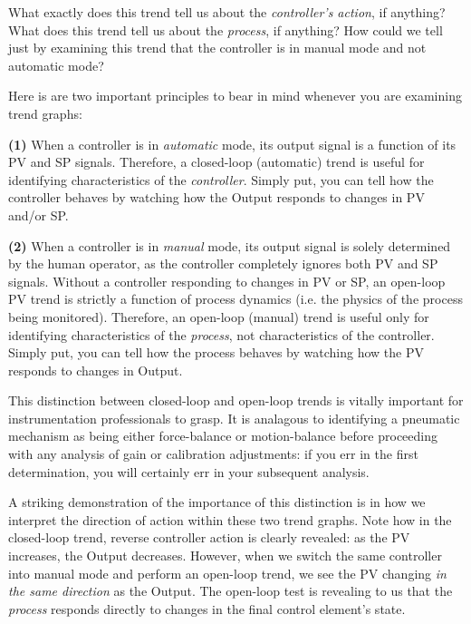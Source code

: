 What exactly does this trend tell us about the {\it controller's action}, if anything?  What does this trend tell us about the {\it process}, if anything?  How could we tell just by examining this trend that the controller is in manual mode and not automatic mode?







\noindent
Here is are two important principles to bear in mind whenever you are examining trend graphs: 

\vskip 10pt

{\bf (1)} When a controller is in {\it automatic} mode, its output signal is a function of its PV and SP signals.  Therefore, a closed-loop (automatic) trend is useful for identifying characteristics of the {\it controller}.  Simply put, you can tell how the controller behaves by watching how the Output responds to changes in PV and/or SP.

\vskip 10pt

{\bf (2)} When a controller is in {\it manual} mode, its output signal is solely determined by the human operator, as the controller completely ignores both PV and SP signals.  Without a controller responding to changes in PV or SP, an open-loop PV trend is strictly a function of process dynamics (i.e. the physics of the process being monitored).  Therefore, an open-loop (manual) trend is useful only for identifying characteristics of the {\it process}, not characteristics of the controller.  Simply put, you can tell how the process behaves by watching how the PV responds to changes in Output.

\vskip 10pt

This distinction between closed-loop and open-loop trends is vitally important for instrumentation professionals to grasp.  It is analagous to identifying a pneumatic mechanism as being either force-balance or motion-balance before proceeding with any analysis of gain or calibration adjustments: if you err in the first determination, you will certainly err in your subsequent analysis.

\vskip 10pt

A striking demonstration of the importance of this distinction is in how we interpret the direction of action within these two trend graphs.  Note how in the closed-loop trend, reverse controller action is clearly revealed: as the PV increases, the Output decreases.  However, when we switch the same controller into manual mode and perform an open-loop trend, we see the PV changing {\it in the same direction} as the Output.  The open-loop test is revealing to us that the {\it process} responds directly to changes in the final control element's state.

